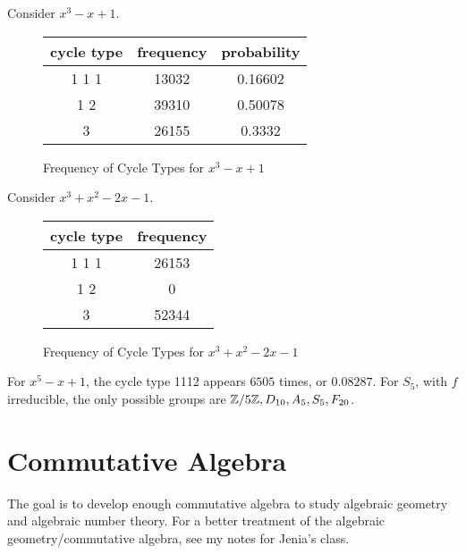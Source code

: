 \documentclass[10pt, twoside]{article}
\begin{document}
        \begin{exm}
            Consider $x^3-x+1$.
            \begin{figure}[H]
                \begin{center}
                    \begin{tabular}{ccc}
                        \toprule
                        cycle type & frequency & probability \\
                        \midrule
                        1 1 1 & 13032 & 0.16602 \\
                        1 2 & 39310 & 0.50078 \\
                        3 & 26155 & 0.3332 \\
                        \bottomrule
                    \end{tabular}
                \end{center}
                \caption{Frequency of Cycle Types for $x^3-x+1$}
            \end{figure}
        \end{exm}
        \begin{exm}
            Consider $x^3+x^2 -2x-1$.
            \begin{figure}[H]
                \begin{center}
                    \begin{tabular}{cc}
                        \toprule
                        cycle type & frequency  \\
                        \midrule
                        1 1 1 & 26153  \\
                        1 2 & 0  \\
                        3 & 52344  \\
                        \bottomrule
                    \end{tabular}
                \end{center}
                \caption{Frequency of Cycle Types for $x^3+x^2-2x-1$}
            \end{figure}
        \end{exm}

        \begin{exm}
            For $x^5-x+1$, the cycle type 1112 appears $6505$ times, or $0.08287$. For $S_5$, with $f$ irreducible, the only possible groups are $\mathbb{Z}/5\mathbb{Z}, D_{10}, A_5, S_5, F_{20}$.
        \end{exm}

        \section{Commutative Algebra}
        The goal is to develop enough commutative algebra to study algebraic geometry and algebraic number theory. For a better treatment of the algebraic geometry/commutative algebra, see my notes for Jenia's class.
\end{document}

